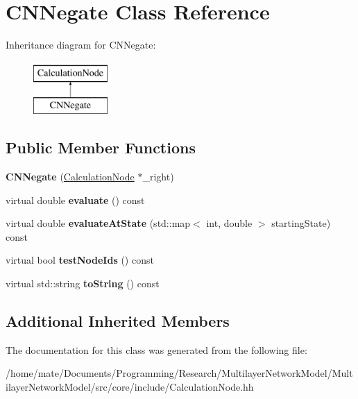 \hypertarget{classCNNegate}{}\section{C\+N\+Negate Class Reference}
\label{classCNNegate}
Inheritance diagram for C\+N\+Negate\+:\begin{figure}[H]
\begin{center}
\leavevmode
\includegraphics[height=2.000000cm]{classCNNegate}
\end{center}
\end{figure}
\subsection*{Public Member Functions}
\begin{DoxyCompactItemize}
\item 
{\bfseries C\+N\+Negate} (\hyperlink{classCalculationNode}{Calculation\+Node} $\ast$\+\_\+right)\hypertarget{classCNNegate_a7ed8699cfcdf9e6cb4e08c2f386ec8aa}{}\label{classCNNegate_a7ed8699cfcdf9e6cb4e08c2f386ec8aa}

\item 
virtual double {\bfseries evaluate} () const \hypertarget{classCNNegate_ad8742ef807da75fea0d512467d5331cd}{}\label{classCNNegate_ad8742ef807da75fea0d512467d5331cd}

\item 
virtual double {\bfseries evaluate\+At\+State} (std\+::map$<$ int, double $>$ starting\+State) const \hypertarget{classCNNegate_a466eaeee589ea62f77dab230b4da9ab7}{}\label{classCNNegate_a466eaeee589ea62f77dab230b4da9ab7}

\item 
virtual bool {\bfseries test\+Node\+Ids} () const \hypertarget{classCNNegate_ad03475bf5217a1673057e74f60b7b7fe}{}\label{classCNNegate_ad03475bf5217a1673057e74f60b7b7fe}

\item 
virtual std\+::string {\bfseries to\+String} () const \hypertarget{classCNNegate_a8cf6b243b14cfbeb28434f301303d1a9}{}\label{classCNNegate_a8cf6b243b14cfbeb28434f301303d1a9}

\end{DoxyCompactItemize}
\subsection*{Additional Inherited Members}


The documentation for this class was generated from the following file\+:\begin{DoxyCompactItemize}
\item 
/home/mate/\+Documents/\+Programming/\+Research/\+Multilayer\+Network\+Model/\+Multilayer\+Network\+Model/src/core/include/Calculation\+Node.\+hh\end{DoxyCompactItemize}
